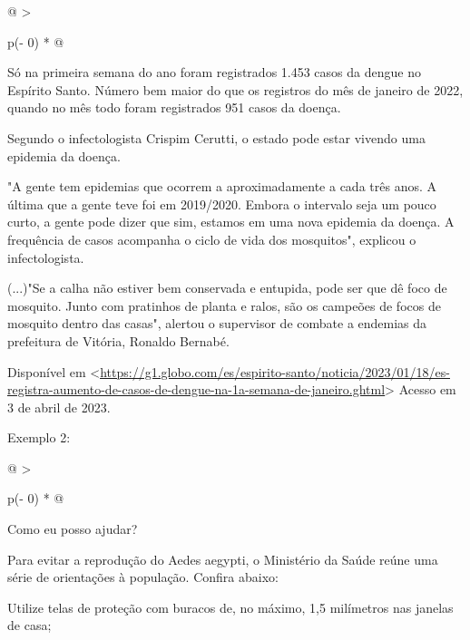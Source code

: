 {\begin{longtable}[]{@{}
  >{\raggedright\arraybackslash}p{(\columnwidth - 0\tabcolsep) * }@{}}
Só na primeira semana do ano foram registrados 1.453 casos da dengue no
Espírito Santo. Número bem maior do que os registros do mês de janeiro
de 2022, quando no mês todo foram registrados 951 casos da doença.

Segundo o infectologista Crispim Cerutti, o estado pode estar vivendo
uma epidemia da doença.

"A gente tem epidemias que ocorrem a aproximadamente a cada três anos. A
última que a gente teve foi em 2019/2020. Embora o intervalo seja um
pouco curto, a gente pode dizer que sim, estamos em uma nova epidemia da
doença. A frequência de casos acompanha o ciclo de vida dos mosquitos",
explicou o infectologista.

(...)"Se a calha não estiver bem conservada e entupida, pode ser que dê
foco de mosquito. Junto com pratinhos de planta e ralos, são os campeões
de focos de mosquito dentro das casas", alertou o supervisor de combate
a endemias da prefeitura de Vitória, Ronaldo Bernabé. \\
\bottomrule
\end{longtable}

Disponível em
\textless{}\href{https://g1.globo.com/es/espirito-santo/noticia/2023/01/18/es-registra-aumento-de-casos-de-dengue-na-1a-semana-de-janeiro.ghtml}{\uline{https://g1.globo.com/es/espirito-santo/noticia/2023/01/18/es-registra-aumento-de-casos-de-dengue-na-1a-semana-de-janeiro.ghtml}}\textgreater{}
Acesso em 3 de abril de 2023.

Exemplo 2:

\begin{longtable}[]{@{}
  >{\raggedright\arraybackslash}p{(\columnwidth - 0\tabcolsep) * }@{}}
\toprule
\endhead
\begin{minipage}[t]{\linewidth}\raggedright
Como eu posso ajudar?

Para evitar a reprodução do Aedes aegypti, o Ministério da Saúde reúne
uma série de orientações à população. Confira abaixo:

Utilize telas de proteção com buracos de, no máximo, 1,5 milímetros nas
janelas de casa;


\end{minipage}
\end{longtable}}
